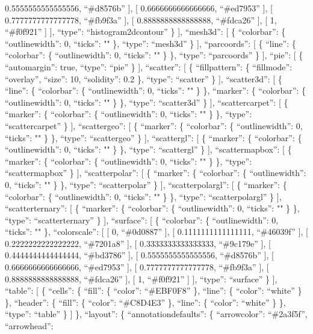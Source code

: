 \documentclass[
]{article}
\begin{document}
0.5555555555555556, ``\#d8576b'' {]}, {[} 0.6666666666666666,
``\#ed7953'' {]}, {[} 0.7777777777777778, ``\#fb9f3a'' {]}, {[}
0.8888888888888888, ``\#fdca26'' {]}, {[} 1, ``\#f0f921'' {]} {]},
``type'': ``histogram2dcontour'' \} {]}, ``mesh3d'': {[} \{
``colorbar'': \{ ``outlinewidth'': 0, ``ticks'': "" \}, ``type'':
``mesh3d'' \} {]}, ``parcoords'': {[} \{ ``line'': \{ ``colorbar'': \{
``outlinewidth'': 0, ``ticks'': "" \} \}, ``type'': ``parcoords'' \}
{]}, ``pie'': {[} \{ ``automargin'': true, ``type'': ``pie'' \} {]},
``scatter'': {[} \{ ``fillpattern'': \{ ``fillmode'': ``overlay'',
``size'': 10, ``solidity'': 0.2 \}, ``type'': ``scatter'' \} {]},
``scatter3d'': {[} \{ ``line'': \{ ``colorbar'': \{ ``outlinewidth'': 0,
``ticks'': "" \} \}, ``marker'': \{ ``colorbar'': \{ ``outlinewidth'':
0, ``ticks'': "" \} \}, ``type'': ``scatter3d'' \} {]},
``scattercarpet'': {[} \{ ``marker'': \{ ``colorbar'': \{
``outlinewidth'': 0, ``ticks'': "" \} \}, ``type'': ``scattercarpet'' \}
{]}, ``scattergeo'': {[} \{ ``marker'': \{ ``colorbar'': \{
``outlinewidth'': 0, ``ticks'': "" \} \}, ``type'': ``scattergeo'' \}
{]}, ``scattergl'': {[} \{ ``marker'': \{ ``colorbar'': \{
``outlinewidth'': 0, ``ticks'': "" \} \}, ``type'': ``scattergl'' \}
{]}, ``scattermapbox'': {[} \{ ``marker'': \{ ``colorbar'': \{
``outlinewidth'': 0, ``ticks'': "" \} \}, ``type'': ``scattermapbox'' \}
{]}, ``scatterpolar'': {[} \{ ``marker'': \{ ``colorbar'': \{
``outlinewidth'': 0, ``ticks'': "" \} \}, ``type'': ``scatterpolar'' \}
{]}, ``scatterpolargl'': {[} \{ ``marker'': \{ ``colorbar'': \{
``outlinewidth'': 0, ``ticks'': "" \} \}, ``type'': ``scatterpolargl''
\} {]}, ``scatterternary'': {[} \{ ``marker'': \{ ``colorbar'': \{
``outlinewidth'': 0, ``ticks'': "" \} \}, ``type'': ``scatterternary''
\} {]}, ``surface'': {[} \{ ``colorbar'': \{ ``outlinewidth'': 0,
``ticks'': "" \}, ``colorscale'': {[} {[} 0, ``\#0d0887'' {]}, {[}
0.1111111111111111, ``\#46039f'' {]}, {[} 0.2222222222222222,
``\#7201a8'' {]}, {[} 0.3333333333333333, ``\#9c179e'' {]}, {[}
0.4444444444444444, ``\#bd3786'' {]}, {[} 0.5555555555555556,
``\#d8576b'' {]}, {[} 0.6666666666666666, ``\#ed7953'' {]}, {[}
0.7777777777777778, ``\#fb9f3a'' {]}, {[} 0.8888888888888888,
``\#fdca26'' {]}, {[} 1, ``\#f0f921'' {]} {]}, ``type'': ``surface'' \}
{]}, ``table'': {[} \{ ``cells'': \{ ``fill'': \{ ``color'':
``\#EBF0F8'' \}, ``line'': \{ ``color'': ``white'' \} \}, ``header'': \{
``fill'': \{ ``color'': ``\#C8D4E3'' \}, ``line'': \{ ``color'':
``white'' \} \}, ``type'': ``table'' \} {]} \}, ``layout'': \{
``annotationdefaults'': \{ ``arrowcolor'': ``\#2a3f5f'', ``arrowhead'':
\end{document}
